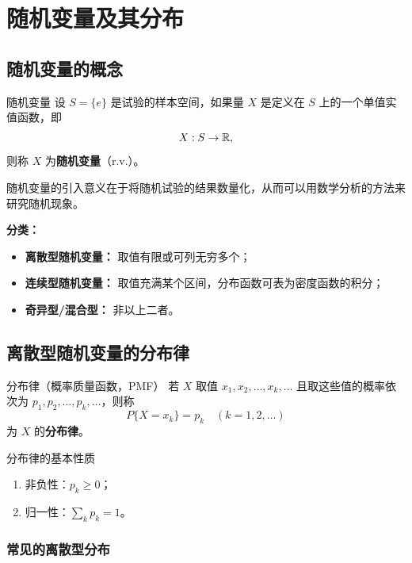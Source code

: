 \chapter{随机变量及其分布}


\section{随机变量的概念}

\begin{mydefinition}{随机变量}
	设 $S = \{e\}$ 是试验的样本空间，如果量 $X$ 是定义在 $S$ 上的一个单值实值函数，即
	\[X: S \to \mathbb{R},\]
	则称 $X$ 为\textbf{随机变量}（r.v.）。
\end{mydefinition}

随机变量的引入意义在于将随机试验的结果数量化，从而可以用数学分析的方法来研究随机现象。

\textbf{分类：}
\begin{itemize}
	\item \textbf{离散型随机变量：} 取值有限或可列无穷多个；
	\item \textbf{连续型随机变量：} 取值充满某个区间，分布函数可表为密度函数的积分；
	\item \textbf{奇异型/混合型：} 非以上二者。
\end{itemize}

\section{离散型随机变量的分布律}

\begin{mydefinition}{分布律（概率质量函数，PMF）}
	若 $X$ 取值 $x_1, x_2, \ldots, x_k, \ldots$ 且取这些值的概率依次为 $p_1, p_2, \ldots, p_k, \ldots$，则称
	\[P\{X = x_k\} = p_k\quad (k = 1, 2, \ldots)\]
	为 $X$ 的\textbf{分布律}。
\end{mydefinition}

\begin{myproperty}{分布律的基本性质}
\begin{enumerate}
	\item 非负性：$p_k \geq 0$；
	\item 归一性：$\displaystyle\sum_{k} p_k = 1$。
\end{enumerate}
\end{myproperty}

\subsection{常见的离散型分布}

